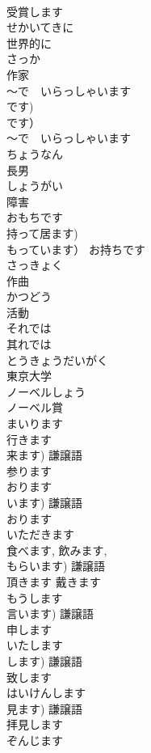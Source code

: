 \documentclass[8pt]{extreport}
\begin{document}
\begin{CJK}{UTF8}{min}
\\	受賞します		
\\	せかいてきに	
\\	世界的に		
\\	さっか	
\\	作家		
\\	〜で　いらっしゃいます	
\\	です) 
\\	です） 
\\	〜で　いらっしゃいます		
\\	ちょうなん	
\\	長男		
\\	しょうがい	
\\	障害		
\\	おもちです	
\\	持って居ます) 
\\	もっています）	お持ちです		
\\	さっきょく	
\\	作曲		
\\	かつどう	
\\	活動		
\\	それでは	
\\	其れでは		
\\	とうきょうだいがく	
\\	東京大学		
\\	ノーベルしょう	
\\	ノーベル賞		
\\	まいります	
\\	行きます 
\\	来ます) 謙譲語 
\\	参ります	
\\	おります	
\\	います) 謙譲語 
\\	おります	
\\	いただきます	
\\	食べます, 飲みます, 
\\	もらいます) 謙譲語 
\\	頂きます 戴きます	
\\	もうします	
\\	言います) 謙譲語 
\\	申します	
\\	いたします	
\\	します) 謙譲語 
\\	致します	
\\	はいけんします	
\\	見ます) 謙譲語 
\\	拝見します	
\\	ぞんじます	

\end{CJK}
\end{document}
